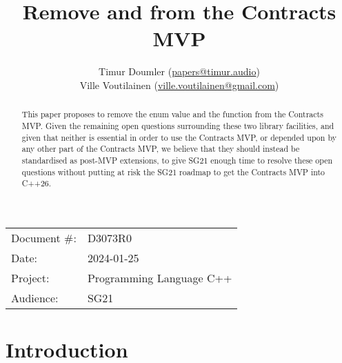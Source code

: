 

 \usepackage[bottom]{footmisc} 


\title{Remove  and  from the Contracts MVP}
\author{ Timur Doumler \small(\href{mailto:papers@timur.audio}{papers@timur.audio}) \\
Ville Voutilainen \small(\href{mailto:ville.voutilainen@gmail.com}{ville.voutilainen@gmail.com})  
}
\date{}
\maketitle

\begin{tabular}{ll}
Document \#: & D3073R0 \\
Date: &2024-01-25 \\
Project: & Programming Language C++ \\
Audience: & SG21
\end{tabular}

\begin{abstract}
This paper proposes to remove the enum value  and the function \mbox{} from the Contracts MVP. Given the remaining open questions surrounding these two library facilities, and given that neither is essential in order to use the Contracts MVP, or depended upon by any other part of the Contracts MVP, we believe that they should instead be standardised as post-MVP extensions, to give SG21 enough time to resolve these open questions without putting at risk the SG21 roadmap to get the Contracts MVP into C++26.
\end{abstract}

\section{Introduction}
\label{sec:intro}

